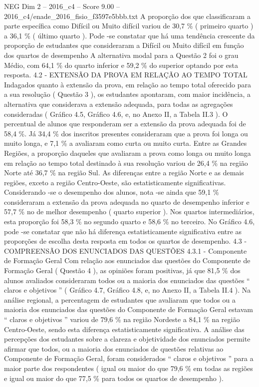 \begin{textsample}{NEG Dim 2 – 2016\_c4 – Score 9.00 – 2016\_c4/enade\_2016\_fisio\_f3597e5bbb.txt}
A proporção dos que classificaram a parte específica como Difícil ou Muito difícil variou de 30,7 \% ( primeiro quarto ) a 36,1 \% ( último quarto ).
Pode -se constatar que há uma tendência crescente da proporção de estudantes que consideraram a Difícil ou Muito difícil em função dos quartos de desempenho A alternativa modal para a Questão 2 foi o grau Médio, com 64,1 \% do quarto inferior e 59,2 \% do superior optando por esta resposta. 4.2 - EXTENSÃO DA PROVA EM RELAÇÃO AO TEMPO TOTAL Indagados quanto à extensão da prova, em relação ao tempo total oferecido para a sua resolução ( Questão 3 ), os estudantes apontaram, com maior incidência, a alternativa que considerava a extensão adequada, para todas as agregações consideradas ( Gráfico 4.5, Gráfico 4.6, e, no Anexo II, a Tabela II.3 ).
O percentual de alunos que responderam ser a extensão da prova adequada foi de 58,4 \%.
Já 34,4 \% dos inscritos presentes consideraram que a prova foi longa ou muito longa, e 7,1 \% a avaliaram como curta ou muito curta.
Entre as Grandes Regiões, a proporção daqueles que avaliaram a prova como longa ou muito longa em relação ao tempo total destinado à sua resolução variou de 26,4 \% na região Norte até 36,7 \% na região Sul.
As diferenças entre a região Norte e as demais regiões, exceto a região Centro-Oeste, são estatisticamente significativas.
Considerando -se o desempenho dos alunos, nota -se ainda que 59,1 \% consideraram a extensão da prova adequada no quarto de desempenho inferior e 57,7 \% no de melhor desempenho ( quarto superior ).
Nos quartos intermediários, esta proporção foi 58,3 \% no segundo quarto e 58,6 \% no terceiro.
No Gráfico 4.6, pode -se constatar que não há diferença estatisticamente significativa entre as proporções de escolha desta resposta em todos os quartos de desempenho. 4.3 - COMPREENSÃO DOS ENUNCIADOS DAS QUESTÕES 4.3.1 - Componente de Formação Geral Com relação aos enunciados das questões do Componente de Formação Geral ( Questão 4 ), as opiniões foram positivas, já que 81,5 \% dos alunos avaliados consideraram todos ou a maioria dos enunciados das questões “ claros e objetivos ” ( Gráfico 4.7, Gráfico 4.8, e, no Anexo II, a Tabela II.4 ).
Na análise regional, a percentagem de estudantes que avaliaram que todos ou a maioria dos enunciados das questões do Componente de Formação Geral estavam “ claros e objetivos ” variou de 79,6 \% na região Nordeste a 84,1 \% na região Centro-Oeste, sendo esta diferença estatisticamente significativa.
A análise das percepções dos estudantes sobre a clareza e objetividade dos enunciados permite afirmar que todos, ou a maioria dos enunciados de questões relativas ao Componente de Formação Geral, foram considerados “ claros e objetivos ” para a maior parte dos respondentes ( igual ou maior do que 79,6 \% em todas as regiões e igual ou maior do que 77,5 \% para todos os quartos de desempenho ).

\end{textsample}
